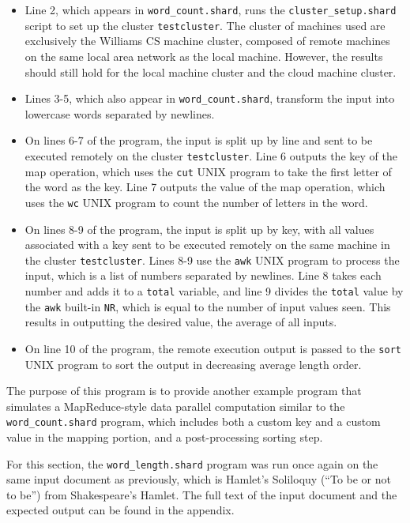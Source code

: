 \documentclass[oneside]{report}
\begin{document}
\begin{itemize}
  \item
        Line 2, which appears in \texttt{word\_count.shard}, runs the \texttt{cluster\_setup.shard} script to set up the cluster \texttt{testcluster}.
        The cluster of machines used are exclusively the Williams CS machine cluster, composed of remote machines on the same local area network as the local machine. However, the results should still hold for the local machine cluster and the cloud machine cluster.
  \item Lines 3-5, which also appear in \texttt{word\_count.shard}, transform the input into lowercase words separated by newlines.
  \item On lines 6-7 of the program, the input is split up by line and sent to be executed remotely on the cluster \texttt{testcluster}.
        Line 6 outputs the key of the map operation, which uses the \texttt{cut} UNIX program to take the first letter of the word as the key.
        Line 7 outputs the value of the map operation, which uses the \texttt{wc} UNIX program to count the number of letters in the word.
  \item  On lines 8-9 of the program, the input is split up by key, with all values associated with a key sent to be executed remotely on the same machine in the cluster \texttt{testcluster}.
        Lines 8-9 use the \texttt{awk} UNIX program to process the input, which is a list of numbers separated by newlines.
        Line 8 takes each number and adds it to a \texttt{total} variable, and line 9 divides the \texttt{total} value by the \texttt{awk} built-in \texttt{NR}, which is equal to the number of input values seen. This results in outputting the desired value, the average of all inputs.
  \item On line 10 of the program, the remote execution output is passed to the \texttt{sort} UNIX program to sort the output in decreasing average length order.
\end{itemize}
The purpose of this program is to provide another example program that simulates a MapReduce-style data parallel computation similar to the \texttt{word\_count.shard} program, which includes both a custom key and a custom value in the mapping portion, and a post-processing sorting step.

For this section, the \texttt{word\_length.shard} program was run once again on the same input document as previously, which is Hamlet's Soliloquy (``To be or not to be'') from Shakespeare's Hamlet.
The full text of the input document and the expected output can be found in the appendix.
\end{document}
